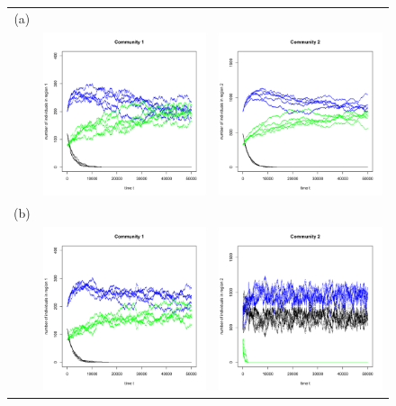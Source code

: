 \begin{figure}[htbp]
\begin{center}
\begin{tabular}{ccc}
(a)&&\\
&\includegraphics[width=2in]{region1nodist} &\includegraphics[width=2in]{region2nodist}\\
(b)&&\\
&\includegraphics[width=2in]{region1distnotmixed} &\includegraphics[width=2in]{region2distnotmixed}\\

\end{tabular}
\end{center}
\end{figure}

